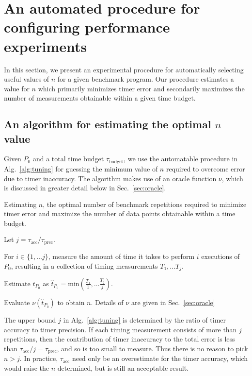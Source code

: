 \documentclass[conference]{IEEEtran}
\begin{document}
\section{An automated procedure for configuring performance experiments}
\label{sec:confexperiment}

In this section, we present an experimental procedure for automatically selecting useful
values of $n$ for a given benchmark program. Our procedure estimates a value for $n$ which
primarily minimizes timer error and secondarily maximizes the number of measurements
obtainable within a given time budget.

\subsection{An algorithm for estimating the optimal $n$ value}

Given $P_0$ and a total time budget $\tau_{\textrm{budget}}$, we use the automatable
procedure in Alg.~\ref{alg:tuning} for guessing the minimum value of $n$ required to
overcome error due to timer inaccuracy. The algorithm makes use of an oracle function $\nu$,
which is discussed in greater detail below in Sec.~\ref{sec:oracle}.

\begin{algorithm}
    \caption{Estimating $n$, the optimal number of benchmark repetitions required to
    minimize timer error and maximize the number of data points obtainable within a
    time budget.}
    \label{alg:tuning}
    Let $j = \tau_{\textrm{acc}} / \tau_{\textrm{prec}}$.

    For $i \in \{1, \dots j\}$, measure the amount of time it takes to perform $i$
    executions of $P_0$, resulting in a collection of timing measurements $T_1, \dots T_j$.

    Estimate $t_{P_0}$ as $\hat{t}_{P_0} = \textrm{min}(\frac{T_1}{1}, \dots \frac{T_j}{j})$.

    Evaluate $\nu(\hat{t}_{P_0})$ to obtain $n$. Details of $\nu$ are given in Sec.~\ref{sec:oracle}
\end{algorithm}

The upper bound $j$ in Alg.~\ref{alg:tuning} is determined by the ratio of
timer accuracy to timer precision. If each timing measurement consists of more
than $j$ repetitions, then the contribution of timer inaccuracy to the total
error is less than $\tau_\textrm{acc} / j = \tau_\textrm{prec}$, and so is too
small to measure. Thus there is no reason to pick $n > j$. In practice,
$\tau_\textrm{acc}$ need only be an overestimate for the timer accuracy,
which would raise the $n$ determined, but is still an acceptable result.
\end{document}
